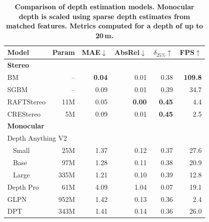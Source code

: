 \begin{table}[t]
	\centering
	\small
	\caption{\bfseries Comparison of depth estimation models. Monocular depth is scaled using sparse depth estimates from matched features. Metrics computed for a depth of up to 20\,m.}
	\label{tab:depth_models}
	\begin{tabular}{|lrrrrr|}
		\hline
		\textbf{Model}                          &
		\textbf{Param}                          &
		\textbf{MAE}$\downarrow$                &
		\textbf{AbsRel}$\downarrow$             &
		\textbf{$\delta_{25\%}$}$\uparrow$      &
		\textbf{FPS}$\uparrow$                                                                                          \\
		\hline\hline
		\textbf{Stereo}                         &      &               &               &               &                \\
		BM                                      & --   & \textbf{0.04} & 0.01          & 0.38          & \textbf{109.8} \\
		SGBM                                    & --   & 0.09          & 0.01          & 0.39          & 34.7           \\
		RAFTStereo                              & 11M  & 0.05          & \textbf{0.00} & \textbf{0.45} & 4.4            \\
		CREStereo                               & 5M   & 0.09          & 0.01          & \textbf{0.45} & 2.5            \\
		\hline\hline
		\multicolumn{2}{|l}{\textbf{Monocular}} &      &               &               &                                \\
		\multicolumn{2}{|l}{Depth Anything V2}  &      &               &               &                                \\
		~ Small                                 & 25M  & 1.37          & 0.12          & 0.37          & 27.6           \\
		~ Base                                  & 97M  & 1.28          & 0.11          & 0.38          & 20.9           \\
		~ Large                                 & 335M & 1.21          & 0.10          & 0.39          & 12.8           \\
		Depth Pro                               & 61M  & 4.09          & 1.04          & 0.07          & 19.1           \\
		GLPN                                    & 952M & 1.42          & 0.13          & 0.36          & 2.4            \\
		DPT                                     & 343M & 1.41          & 0.14          & 0.36          & 26.0           \\
		\hline
	\end{tabular}
\end{table}


